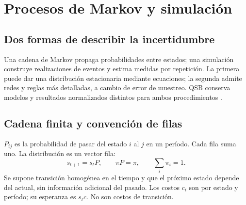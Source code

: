 \chapter{Procesos de Markov y simulación}
\label{ch:markov-simulacion}

\section{Dos formas de describir la incertidumbre}
Una cadena de Markov propaga probabilidades entre estados; una simulación
construye realizaciones de eventos y estima medidas por repetición. La primera
puede dar una distribución estacionaria mediante ecuaciones; la segunda admite
redes y reglas más detalladas, a cambio de error de muestreo. QSB conserva
modelos y resultados normalizados distintos para ambos procedimientos
\cite{ross2019introduction,law2015simulation}.

\section{Cadena finita y convención de filas}
\(P_{ij}\) es la probabilidad de pasar del estado \(i\) al \(j\) en un
período. Cada fila suma uno. La distribución es un vector fila:
\[
 s_{t+1}=s_tP,\qquad \pi P=\pi,\qquad \sum_i\pi_i=1.
\]
Se supone transición homogénea en el tiempo y que el próximo estado depende del
actual, sin información adicional del pasado. Los costos \(c_i\) son por
estado y período; su esperanza es \(s_tc\). No son costos de transición.

